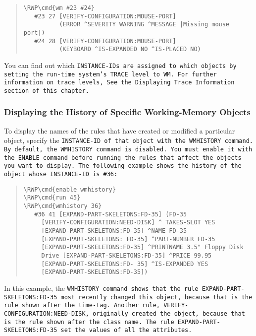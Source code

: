 \begin{quote}
\begin{Verbatim}[commandchars=\\\{\}]
\RWP\cmd{wm #23 #24}
   #23 27 [VERIFY-CONFIGURATION:MOUSE-PORT]
          (ERROR ^SEVERITY WARNING ^MESSAGE |Missing mouse port|)
   #24 28 [VERIFY-CONFIGURATION:MOUSE-PORT]
          (KEYBOARD ^IS-EXPANDED NO ^IS-PLACED NO)
\end{Verbatim}
\end{quote}

You can find out which \tt{INSTANCE-ID}s are assigned to which
objects by setting the run-time system's \tt{TRACE} level to \tt{WM}. For
further information on trace levels, See the Displaying Trace
Information section of this chapter.

\subsubsection{Displaying the History of Specific Working-Memory
  Objects}

To display the names of the rules that have created or modified a
particular object, specify the \tt{INSTANCE-ID} of that object with
the \tt{WMHISTORY} command. By default, the \tt{WMHISTORY} command is
disabled. You must enable it with the \tt{ENABLE} command before
running the rules that affect the objects you want to display.  The
following example shows the history of the object whose
\tt{INSTANCE-ID} is \verb|#36|:

\begin{quote}
\begin{Verbatim}[commandchars=\\\{\}]
\RWP\cmd{enable wmhistory}
\RWP\cmd{run 45}
\RWP\cmd{wmhistory 36}
   #36 41 [EXPAND-PART-SKELETONS:FD-35] (FD-35
     [VERIFY-CONFIGURATION:NEED-DISK] ^ TAKES-SLOT YES
     [EXPAND-PART-SKELETONS:FD-35] ^NAME FD-35
     [EXPAND-PART-SKELETONS: FD-35] ^PART-NUMBER FD-35
     [EXPAND-PART-SKELETONS:FD-35] ^PRINTNAME 3.5" Floppy Disk
     Drive [EXPAND-PART-SKELETONS:FD-35] ^PRICE 99.95
     [EXPAND-PART-SKELETONS:FD- 35] ^IS-EXPANDED YES
     [EXPAND-PART-SKELETONS:FD-35])
\end{Verbatim}
\end{quote}

In this example, the \tt{WMHISTORY} command shows that the rule
\tt{EXPAND-PART-SKELETONS:FD-35} most recently changed this object,
because that is the rule shown after the time-tag. Another rule,
\tt{VERIFY-CONFIGURATION:NEED-DISK}, originally created the object,
because that is the rule shown after the class name. The rule
\tt{EXPAND-PART-SKELETONS:FD-35} set the values of all the attributes.

